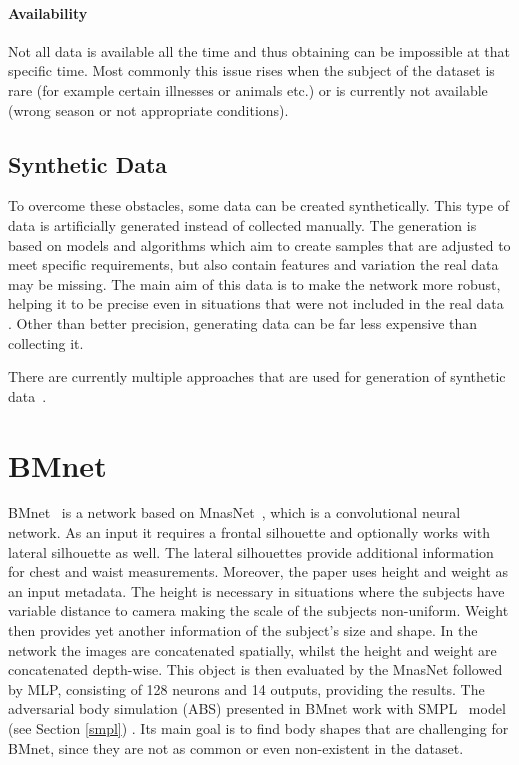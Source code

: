 \paragraph{Availability} Not all data is available all the time and thus obtaining can be impossible at that specific time. Most commonly this issue rises when the subject of the dataset is rare (for example certain illnesses or animals etc.) or is currently not available (wrong season or not appropriate conditions).

\subsection{Synthetic Data}
To overcome these obstacles, some data can be created synthetically. This type of data is artificially generated instead of collected manually. The generation is based on models and algorithms which aim to create samples that are adjusted to meet specific requirements, but also contain features and variation the real data may be missing. The main aim of this data is to make the network more robust, helping it to be precise even in situations that were not included in the real data \cite{synthDataRobust}. Other than better precision, generating data can be far less expensive than collecting it. 

There are currently multiple approaches that are used for generation of synthetic data~\cite{synthDataReview}. 

\section{BMnet}
BMnet~\cite{BodyM} is a network based on MnasNet~\cite{mnasnet}, which is a convolutional neural network.  As an input it requires a frontal silhouette and optionally works with lateral silhouette as well. The lateral silhouettes provide additional information for chest and waist measurements. Moreover, the paper uses height and weight as an input metadata. The height is necessary in situations where the subjects have variable distance to camera making the scale of the subjects non-uniform. Weight then provides yet another information of the subject's size and shape. In the network the images are concatenated spatially, whilst the height and weight are concatenated depth-wise. This object is then evaluated by the MnasNet followed by MLP, consisting of 128 neurons and 14 outputs, providing the results.
The adversarial body simulation (ABS) presented in BMnet work with SMPL~\cite{smpl} model (see Section \ref{smpl}) . Its main goal is to find body shapes that are challenging for BMnet, since they are not as common or even non-existent in the dataset.
 

